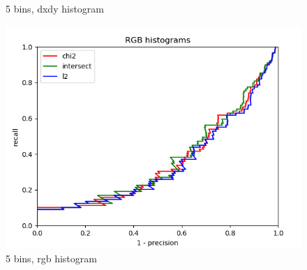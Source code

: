 \documentclass{article}
\begin{document}
\begin{figure}[ht]
\begin{minipage}{.5\textwidth}
        \cprotect\caption{5 bins, dxdy histogram}
    \end{minipage}
    \begin{minipage}{.5\textwidth}
        \includegraphics[width=\linewidth]{images/Q4.b-rgb_histogram_5_bins.png}
        \cprotect\caption{5 bins, rgb histogram}
    \end{minipage}
\end{figure}
\end{document}
